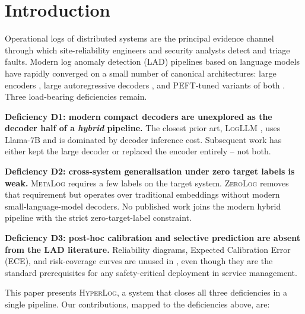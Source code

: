 \documentclass[journal, twoside]{IEEEtran}
\newcommand{\hylog}{\textsc{HyperLog}}
\newcommand{\ece}{\textsc{ECE}}
\begin{document}
\section{Introduction}\label{sec:intro}

Operational logs of distributed systems are the principal evidence
channel through which site-reliability engineers and security analysts
detect and triage faults. Modern log anomaly detection (LAD) pipelines
based on language models have rapidly converged on a small number of
canonical architectures: large encoders \cite{logbert2021,logfit2024},
large autoregressive decoders \cite{logllm2024}, and PEFT-tuned variants
of both \cite{logadreft2025,logtinyllm2025}. Three load-bearing
deficiencies remain.

\textbf{Deficiency D1: modern compact decoders are unexplored as the
decoder half of a \emph{hybrid} pipeline.} The closest prior art,
\textsc{LogLLM} \cite{logllm2024}, uses Llama-7B and is dominated by
decoder inference cost. Subsequent work has either kept the large
decoder \cite{logllm2024} or replaced the encoder entirely
\cite{logtinyllm2025} -- not both.

\textbf{Deficiency D2: cross-system generalisation under zero target
labels is weak.} \textsc{MetaLog} \cite{metalog2024} requires a few
labels on the target system. \textsc{ZeroLog} \cite{zerolog2025}
removes that requirement but operates over traditional embeddings
without modern small-language-model decoders. No published work joins
the modern hybrid pipeline with the strict zero-target-label
constraint.

\textbf{Deficiency D3: post-hoc calibration and selective prediction
are absent from the LAD literature.} Reliability diagrams, Expected
Calibration Error (\ece{}), and risk-coverage curves are unused in
\cite{logbert2021,logfit2024,logllm2024,metalog2024,zerolog2025}, even
though they are the standard prerequisites for any safety-critical
deployment in service management.

This paper presents \hylog, a system that closes all three deficiencies
in a single pipeline. Our contributions, mapped to the deficiencies
above, are:
\end{document}
